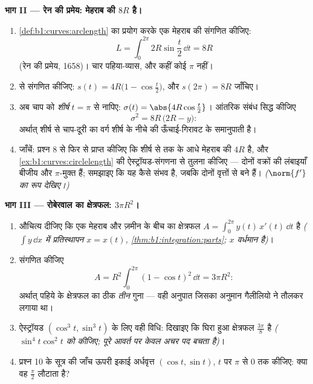 \begin{problem}
\medskip \noindent\textbf{भाग II --- रेन की प्रमेय: मेहराब की  $8R$
है।}
\begin{enumerate}[resume]
  \item \cref{def:b1:curves:arclength} का प्रयोग करके एक मेहराब की 
  संगणित कीजिए:
        \[
        L = \int_0^{2\pi} 2R\sin\frac t2\,\dd t = 8R
        \]
        (रेन की प्रमेय, 1658)। चार पहिया-व्यास, और कहीं कोई $\pi$ नहीं।
  \item {} से  संगणित कीजिए: $s(t) = 4R\bigl(1 - \cos\frac
  t2\bigr)$, और $s(2\pi) = 8R$ जाँचिए।
  \item अब चाप को \emph{शीर्ष} $t = \pi$ से नापिए: $\sigma(t) =
  \abs{4R\cos\frac t2}$। आंतरिक संबंध सिद्ध कीजिए
        \[
        \sigma^2 = 8R\,\bigl(2R - y\bigr) :
        \]
        अर्थात् शीर्ष से चाप-दूरी का वर्ग शीर्ष के नीचे की ऊँचाई-गिरावट के
        समानुपाती है।
  \item जाँचें: प्रश्न 8 से फिर से प्राप्त कीजिए कि शीर्ष से  तक के
  आधे मेहराब की  $4R$ है, और \cref{ex:b1:curves:circlelength} की
  ऐस्ट्रॉयड-संगणना से तुलना कीजिए --- दोनों वक्रों की लंबाइयाँ बीजीय और
  $\pi$-मुक्त हैं; समझाइए कि यह कैसे संभव है, जबकि दोनों वृत्तों से बने हैं।
  \emph{($\norm{f'}$ का रूप देखिए।)}
\end{enumerate}

\medskip \noindent\textbf{भाग III --- रोबेरवाल का क्षेत्रफल: $3\pi R^2$।}
\begin{enumerate}[resume]
  \item औचित्य दीजिए कि एक मेहराब और ज़मीन के बीच का क्षेत्रफल $A =
  \int_0^{2\pi} y(t)\,x'(t)\,\dd t$ है \emph{($\int y\,\dd x$ में
  प्रतिस्थापन $x = x(t)$, \cref{thm:b1:integration:parts}; $x$ वर्धमान है)}।
  \item संगणित कीजिए
        \[
        A = R^2\int_0^{2\pi}(1 - \cos t)^2\,\dd t = 3\pi R^2 :
        \]
        अर्थात् पहिये के क्षेत्रफल का ठीक \emph{तीन} गुना --- वही अनुपात
        जिसका अनुमान गैलीलियो ने तौलकर लगाया था।
  \item ऐस्ट्रॉयड $(\cos^3t, \sin^3t)$ के लिए वही विधि: दिखाइए कि घिरा हुआ
  क्षेत्रफल $\frac{3\pi}8$ है \emph{($\sin^4 t\cos^2 t$ को  कीजिए; पूरे
  आवर्त पर केवल अचर पद बचता है)}।
  \item प्रश्न 10 के सूत्र की जाँच ऊपरी इकाई अर्धवृत्त $(\cos t, \sin t)$,
  $t$ पर $\pi$ से $0$ तक कीजिए: क्या वह $\frac\pi2$ लौटाता है?
\end{enumerate}


\end{problem}
